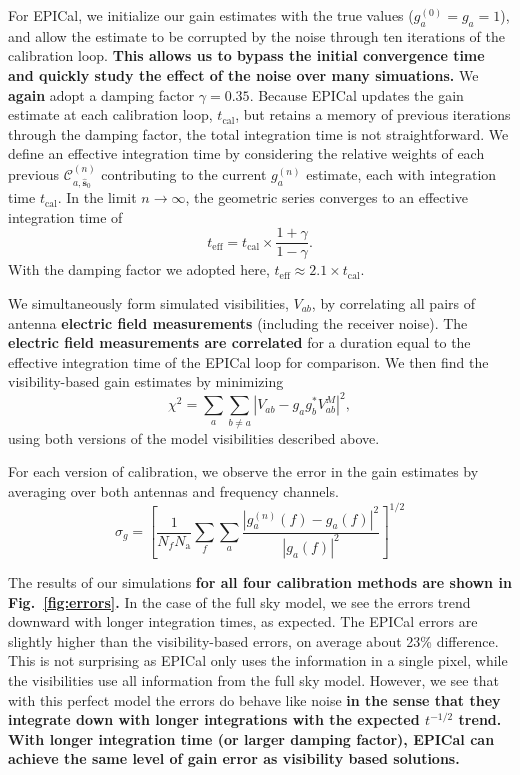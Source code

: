 \documentclass[a4paper,fleqn,usenatbib]{../mnras}
\newcommand{\Nant}{\ensuremath{N_{\mathrm{a}}}}
\newcommand{\spix}{\ensuremath{\hat{\mathbf{s}}_{0}}}
\newcommand{\Cna}[1][n]{\ensuremath{\mathcal{C}^{(#1)}_{a,\spix}}}
\newcommand{\damp}{\ensuremath{\gamma}}
\newcommand{\tcal}{\ensuremath{t_{\mathrm{cal}}}}
\newcommand{\teff}{\ensuremath{t_{\mathrm{eff}}}}
\begin{document}
For EPICal, we initialize our gain estimates with the true values 
(${g^{(0)}_a=g_a=1}$), and allow the estimate to be corrupted by the noise through ten 
iterations of the calibration loop. 
\textbf{This allows us to bypass the initial convergence time and quickly study the effect of the
noise over many simuations.}
We \textbf{again} adopt a damping factor $\damp=0.35$. Because EPICal 
updates the gain estimate at each calibration loop, \tcal, but retains a memory of previous 
iterations through the damping factor, the total integration time is not straightforward. We define 
an effective integration time by considering the relative weights of each previous $\Cna$ 
contributing to the current $g^{(n)}_a$ estimate, each with integration time \tcal. In the limit $n
\rightarrow \infty$, the geometric series converges to an effective integration time of
\begin{equation}\label{eq:teff}
\teff = \tcal \times \frac{1+\damp}{1-\damp}.
\end{equation}
With the damping factor we adopted here, $\teff \approx 2.1 \times \tcal$. 

We simultaneously form simulated visibilities, $V_{ab}$, by correlating all pairs of antenna \textbf{electric field 
measurements} (including the receiver noise). The \textbf{electric field measurements are correlated} for a duration equal to 
the effective integration time of the EPICal loop for comparison. We then find the 
visibility-based gain estimates by minimizing
\begin{equation}\label{eq:vis_cal}
\chi^2 = \sum_a\sum_{b\ne a} \left|V_{ab}-g_a g_b^* V^M_{ab}\right|^2,
\end{equation}
using both versions of the model visibilities described above.

 For each version of calibration, we observe the error in the gain estimates by averaging over both 
 antennas and frequency channels.
\begin{equation}\label{eq:gain_error}
\sigma_g = \left[\frac{1}{N_f \Nant} \sum_f \sum_a \frac{\left|g^{(n)}_a(f)-g_a(f)\right|^2}{\left|g_a(f)\right|^2}\right]^{1/2}
\end{equation}

The results of our simulations \textbf{for all four calibration methods are shown in Fig.~\ref{fig:errors}. }
In the case of the full sky model, we see the errors trend 
downward with longer integration times, as expected. The EPICal errors are slightly higher than 
the visibility-based errors, on average about 23\% difference. This is not surprising as EPICal 
only uses the information in a single pixel, while the visibilities use all information from the full 
sky model. However, we see that with this perfect model the errors do behave like noise
\textbf{in the sense that they integrate down with longer integrations with the expected $t^{-1/2}$ 
trend. }
\textbf{With longer integration time (or larger damping factor), EPICal can achieve the same 
level of gain error as visibility based solutions.}
\end{document}

